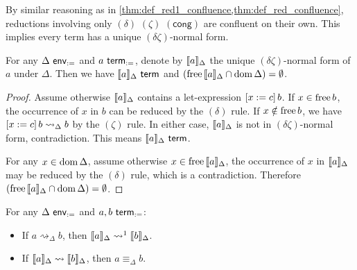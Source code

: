 \documentclass[twoside]{report}
\begin{document}
By similar reasoning as in \cref{thm:def_red1_confluence,thm:def_red_confluence}, reductions involving only $(\delta)$ $(\zeta)$ $(\mathsf{cong})$ are confluent on their own. This implies every term has a unique $(\delta\zeta)$-normal form.

\begin{proposition}[Projection]
    \label{thm:def_projection}
    For any $\Delta \ \mathsf{env}_{:=}$ and $a \ \mathsf{term}_{:=}$, denote by $\llbracket{a}\rrbracket_\Delta$ the unique $(\delta\zeta)$-normal form of $a$ under $\Delta$. Then we have $\llbracket{a}\rrbracket_\Delta \ \mathsf{term}$ and $(\operatorname{free}{\llbracket{a}\rrbracket_\Delta} \cap \operatorname{dom} \Delta) = \emptyset$.
\end{proposition}

\begin{proof}
    Assume otherwise $\llbracket{a}\rrbracket_\Delta$ contains a let-expression $[{x}:={c}]\,{b}$. If $x \in \operatorname{free} b$, the occurrence of $x$ in $b$ can be reduced by the $(\delta)$ rule. If $x \notin \operatorname{free} b$, we have $[{x}:={c}]\,{b} \rightsquigarrow_\Delta b$ by the $(\zeta)$ rule. In either case, $\llbracket{a}\rrbracket_\Delta$ is not in $(\delta\zeta)$-normal form, contradiction. This means $\llbracket{a}\rrbracket_\Delta \ \mathsf{term}$.

    For any $x \in \operatorname{dom} \Delta$, assume otherwise $x \in \operatorname{free}{\llbracket{a}\rrbracket_\Delta}$, the occurrence of $x$ in $\llbracket{a}\rrbracket_\Delta$ may be reduced by the $(\delta)$ rule, which is a contradiction. Therefore $(\operatorname{free}{\llbracket{a}\rrbracket_\Delta} \cap \operatorname{dom} \Delta) = \emptyset$.
\end{proof}

\begin{proposition}[Equivalence]
    \label{thm:def_defeq_equivalence}
    For any $\Delta \ \mathsf{env}_{:=}$ and $a, b \ \mathsf{term}_{:=}$:
    \begin{itemize}[noitemsep]
        \item If $a \rightsquigarrow_\Delta b$, then $\llbracket{a}\rrbracket_\Delta \rightsquigarrow^1 \llbracket{b}\rrbracket_\Delta$.
        \item If $\llbracket{a}\rrbracket_\Delta \rightsquigarrow \llbracket{b}\rrbracket_\Delta$, then $a \equiv_\Delta b$.
    \end{itemize}
\end{proposition}
\end{document}
